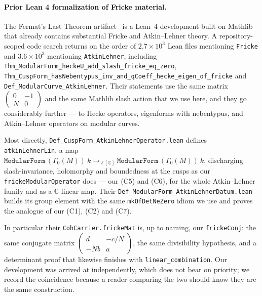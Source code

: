 \documentclass[11pt, a4paper]{article}
\newcommand{\brk}{\discretionary{}{}{}}
\theoremstyle{remark}
\begin{document}
\paragraph{Prior Lean 4 formalization of Fricke material.}
The Fermat's Last Theorem artifact~\cite{FLT2026} is a Lean~4 development built on Mathlib that
already contains substantial Fricke and Atkin--Lehner theory. A repository-scoped code search
returns on the order of $2.7\times10^3$ Lean files mentioning \texttt{Fricke} and
$3.6\times10^3$ mentioning \texttt{AtkinLehner}, including
\texttt{Thm\_ModularForm\_heckeU\_add\brk\_slash\brk\_fricke\brk\_eq\brk\_zero},
\texttt{Thm\_CuspForm\_hasNebentypus\brk\_inv\brk\_and\brk\_qCoeff\brk\_hecke\brk\_eigen\brk\_of\brk\_fricke} and
\texttt{Def\_ModularCurve\_AtkinLehner}. Their statements use the same matrix
$\left(\begin{smallmatrix} 0 & -1 \\ N & 0\end{smallmatrix}\right)$ and the same Mathlib slash
action that we use here, and they go considerably further --- to Hecke operators, eigenforms with
nebentypus, and Atkin--Lehner operators on modular curves.

Most directly, \texttt{Def\_CuspForm\_AtkinLehnerOperator.lean} defines
\texttt{atkinLehnerLin}, a map
$\texttt{ModularForm}\ (\Gamma_0(M))\ k \to_{\ell[\mathbb{C}]} \texttt{ModularForm}\ (\Gamma_0(M))\ k$,
discharging slash-invariance, holomorphy and boundedness at the cusps as our
\texttt{frickeModularOperator} does --- our (C5) and (C6), for the whole Atkin--Lehner family and
as a $\mathbb{C}$-linear map. Their \texttt{Def\_ModularForm\_AtkinLehnerDatum.lean} builds its
group element with the same \texttt{mkOfDetNeZero} idiom we use and proves the analogue of our
(C1), (C2) and (C7).

In particular their \texttt{CohCarrier.frickeMat} is, up to naming, our
\texttt{frickeConj}: the same conjugate matrix
$\left(\begin{smallmatrix} d & -c/N \\ -Nb & a\end{smallmatrix}\right)$, the same divisibility
hypothesis, and a determinant proof that likewise finishes with
\texttt{linear\_combination}. Our development was arrived at independently, which does not bear
on priority; we record the coincidence because a reader comparing the two should know they are
the same construction.
\end{document}
